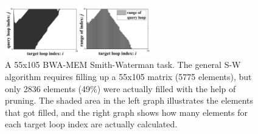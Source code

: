 \begin{figure}[!hbt]
	\begin{center}
		\includegraphics[width=2.5in]{Figures/Figure2C2.jpg}
		\caption {A 55x105 BWA-MEM Smith-Waterman task. The general S-W algorithm requires filling up a 55x105 matrix (5775 elements), but only 2836 elements (49\%) were actually filled with the help of pruning. The shaded area in the left graph illustrates the elements that got filled, and the right graph shows how many elements for each target loop index are actually calculated.}
		\label{fig:F2C2}
	\end{center}
\end{figure}
\vspace{-10pt}

